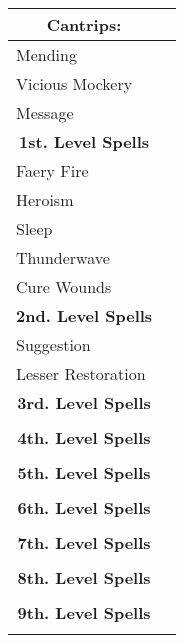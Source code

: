\documentclass[11pt]{article}
\newcommand{\done}{\rlap{$\square$}{\raisebox{2pt}{\large\hspace{1pt}\ding{51}}}}
\begin{document}
	\begin{tabularx}{\textwidth}{X|r}
\multicolumn{1}{c|}{\large \textbf{Cantrips}:} & \\
\hline
Mending 										& 	\\
Vicious Mockery 								& 	\\
Message		 									&	\\

\multicolumn{1}{c|}{\large \textbf{1st. Level Spells}} & \\
\hline
Faery Fire			 							& \done \\
Heroism 										& \done \\
Sleep											& \done \\
Thunderwave 									& \done \\
Cure Wounds				 						& \done \\

\multicolumn{1}{c|}{\large \textbf{2nd. Level Spells}} &	\\
\hline
Suggestion										& \done	\\
Lesser Restoration								& \done \\

\multicolumn{1}{c|}{\large \textbf{3rd. Level Spells}} & \\
\hline
 												&  	\\

\multicolumn{1}{c|}{\large \textbf{4th. Level Spells}} & \\
\hline
 												&  	\\

\multicolumn{1}{c|}{\large \textbf{5th. Level Spells}} & \\
\hline
	 											&  	\\

\multicolumn{1}{c|}{\large \textbf{6th. Level Spells}} & \\
\hline
	 											&  	\\

\multicolumn{1}{c|}{\large \textbf{7th. Level Spells}} & \\
\hline
	 											&  	\\

\multicolumn{1}{c|}{\large \textbf{8th. Level Spells}} & \\
\hline
	 											&  	\\

\multicolumn{1}{c|}{\large \textbf{9th. Level Spells}} & \\
\hline
	 											&
	\end{tabularx}
\end{document}
